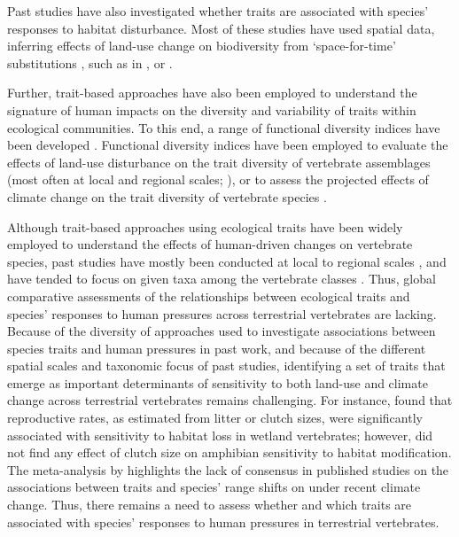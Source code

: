 Past studies have also investigated whether traits are associated with species' responses to habitat disturbance. Most of these studies have used spatial data, inferring effects of land-use change on biodiversity from `space-for-time' substitutions \citep{DePalma2018, Davison2021}, such as in \citet{Newbold2013}, \citet{Quesnelle2014} or \citet{Nowakowski2017}.

Further, trait-based approaches have also been employed to understand the signature of human impacts on the diversity and variability of traits within ecological communities. To this end, a range of functional diversity indices have been developed \citep{Schleuter2010a, Legras2018}. Functional diversity indices have been employed to evaluate the effects of land-use disturbance on the trait diversity of vertebrate assemblages (most often at local and regional scales; \citet{Flynn2009, LaSorte2018, Tinoco2018}), or to assess the projected effects of climate change on the trait diversity of vertebrate species \citep{Stewart2022}.

Although trait-based approaches using ecological traits have been widely employed to understand the effects of human-driven changes on vertebrate species, past studies have mostly been conducted at local to regional scales \citep{Davison2021}, and have tended to focus on given taxa among the vertebrate classes \citep{Hevia2017}. Thus, global comparative assessments of the relationships between ecological traits and species' responses to human pressures across terrestrial vertebrates are lacking. Because of the diversity of approaches used to investigate associations between species traits and human pressures in past work, and because of the different spatial scales and taxonomic focus of past studies, identifying a set of traits that emerge as important determinants of sensitivity to both land-use and climate change across terrestrial vertebrates remains challenging. For instance, \citet{Quesnelle2014} found that reproductive rates, as estimated from litter or clutch sizes, were significantly associated with sensitivity to habitat loss in wetland vertebrates; however, \citet{Nowakowski2017} did not find any effect of clutch size on amphibian sensitivity to habitat modification. The meta-analysis by \citet{MacLean2017} highlights the lack of consensus in published studies on the associations between traits and species' range shifts on under recent climate change.
Thus, there remains a need to assess whether and which traits are associated with species' responses to human pressures in terrestrial vertebrates. 

